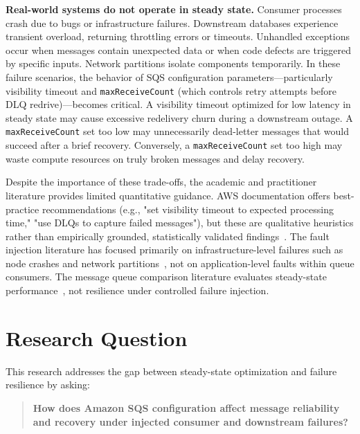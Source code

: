 \textbf{Real-world systems do not operate in steady state.} Consumer processes crash due to bugs or infrastructure failures. Downstream databases experience transient overload, returning throttling errors or timeouts. Unhandled exceptions occur when messages contain unexpected data or when code defects are triggered by specific inputs. Network partitions isolate components temporarily. In these failure scenarios, the behavior of SQS configuration parameters—particularly visibility timeout and \texttt{maxReceiveCount} (which controls retry attempts before DLQ redrive)—becomes critical. A visibility timeout optimized for low latency in steady state may cause excessive redelivery churn during a downstream outage. A \texttt{maxReceiveCount} set too low may unnecessarily dead-letter messages that would succeed after a brief recovery. Conversely, a \texttt{maxReceiveCount} set too high may waste compute resources on truly broken messages and delay recovery.

Despite the importance of these trade-offs, the academic and practitioner literature provides limited quantitative guidance. AWS documentation offers best-practice recommendations (e.g., "set visibility timeout to expected processing time," "use DLQs to capture failed messages"), but these are qualitative heuristics rather than empirically grounded, statistically validated findings~\citep{AWSResilience2023}. The fault injection literature has focused primarily on infrastructure-level failures such as node crashes and network partitions~\citep{Gao2023CrashFuzz, Wu2024Legolas}, not on application-level faults within queue consumers. The message queue comparison literature evaluates steady-state performance~\citep{DiasDeAssuncao2020MQComparison, Maharjan2023Benchmarking}, not resilience under controlled failure injection.

\section{Research Question}

This research addresses the gap between steady-state optimization and failure resilience by asking:

\begin{quote}
\textbf{How does Amazon SQS configuration affect message reliability and recovery under injected consumer and downstream failures?}
\end{quote}

